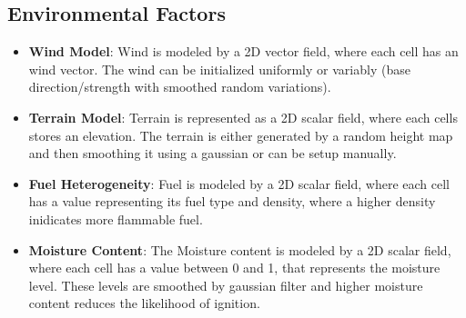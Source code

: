 \subsection{Environmental Factors}
\begin{itemize}
	\item \textbf{Wind Model}: Wind is modeled by a 2D vector field, where each cell has an wind vector. The wind can be initialized uniformly or variably (base direction/strength with smoothed random variations).
	\item \textbf{Terrain Model}: Terrain is represented as a 2D scalar field, where each cells stores an elevation. The terrain is either generated by a random height map and then smoothing it using a gaussian or can be setup manually.
	\item \textbf{Fuel Heterogeneity}: Fuel is modeled by a 2D scalar field, where each cell has a value representing its fuel type and density, where a higher density inidicates more flammable fuel.
	\item \textbf{Moisture Content}: The Moisture content is modeled by a 2D scalar field, where each cell has a value between 0 and 1, that represents the moisture level. These levels are smoothed by gaussian filter and higher moisture content reduces the likelihood of ignition.
\end{itemize}


